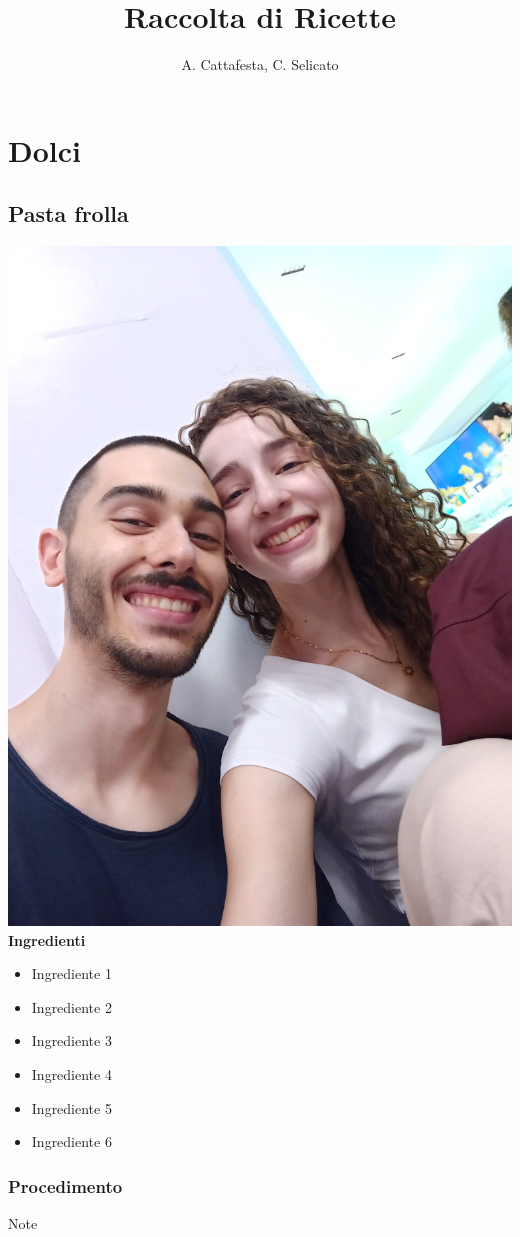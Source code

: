 \documentclass[12pt]{book}
\begin{document}
\title{Raccolta di Ricette}
\author{A. Cattafesta, C. Selicato}
\date{}

\maketitle

\part*{Dolci}

\chapter*{Pasta frolla}

\noindent
\begin{minipage}[!t]{0.3\textwidth}
    \includegraphics[width=\linewidth]{images/test.jpg}\\  %
    \textbf{Ingredienti}
    \begin{itemize}
        \item Ingrediente 1
        \item Ingrediente 2
        \item Ingrediente 3
        \item Ingrediente 4
        \item Ingrediente 5
        \item Ingrediente 6
    \end{itemize}
\end{minipage}%
\hfill
\begin{minipage}[!t]{0.65\textwidth}
    \section*{Procedimento}
    \lipsum[1]  %
\end{minipage}
Note\\	%
\lipsum[2]
\end{document}
